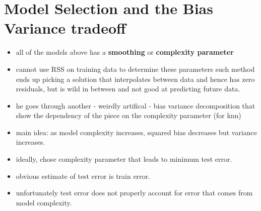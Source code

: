 \section{Model Selection and the Bias Variance tradeoff}
\begin{itemize}
  \item all of the models above has a {\bf smoothing} or {\bf complexity parameter}
  \item cannot use RSS on training data to determine these parameters
    \subitem such method ends up picking a solution that interpolates between data and hence has zero residuals, but is wild in between and not good at predicting future data.
  \item he goes through another - weirdly artifical - bias variance decomposition that show the dependency of the piece on the complexity parameter (for knn)
  \item main idea: as model complexity increases, squared bias decreases but variance increases.
  \item ideally, chose complexity parameter that leads to minimum test error.
  \item obvious estimate of test error is train error. 
  \item unfortunately test error does not properly account for error that comes from model complexity.
\end{itemize}

